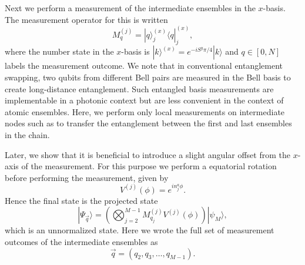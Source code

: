 \documentclass[12pt]{iopart}
\begin{document}


Next we perform a measurement of the intermediate ensembles in the $x$-basis.  The measurement operator for this is written 
%
\begin{equation}
M_q^{(j)} = | q \rangle^{(x)}_j \langle q |^{(x)}_j ,
\label{measurementop}
\end{equation}
%
where the number state in the $ x $-basis is $ | k  \rangle^{(x)} = e^{-iS^y \pi/ 4} | k  \rangle $ and $ q \in [0,N] $ labels the measurement outcome. 
We note that in conventional entanglement swapping, two qubits from different Bell pairs are measured in the Bell basis to create long-distance entanglement. Such entangled basis measurements are implementable in a photonic context but are less convenient in the context of atomic ensembles.  Here, we perform only local measurements on intermediate nodes such as to transfer the entanglement between the first and last ensembles in the chain.  

Later, we show that it is beneficial to introduce a slight angular offset from the $ x $-axis of the measurement.  For this purpose we perform a equatorial rotation before performing the measurement, given by 
%
\begin{equation}
V^{(j)}(\phi)  = e^{i n^a_j \phi} .
\label{equatorrot}
\end{equation}
%
Hence the final state is the projected state
%
\begin{equation}
| \Psi_{\vec{q}} \rangle = \left( \bigotimes_{j=2}^{M-1} M^{(j)}_{q_j} V^{(j)}(\phi) \right) | \psi_M \rangle  ,
\end{equation}
%
which is an unnormalized state.  Here we wrote the full set of measurement outcomes of the intermediate ensembles as
%
\begin{equation}
\vec{q} = (q_2, q_3, \dots, q_{M-1} ) .
\end{equation}
%
\end{document}
